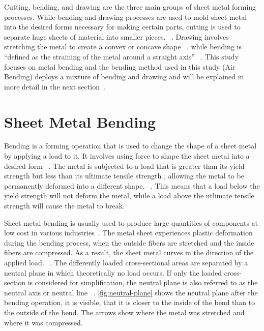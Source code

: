 Cutting, bending, and drawing are the three main groups of sheet metal forming processes.
While bending and drawing processes are used to mold sheet metal into the desired forms necessary for making certain
parts, cutting is used to separate huge sheets of material into smaller pieces.
~\cite[p. 405]{groover_fundamentalsmodernmanufacturing_2020}.
Drawing involves stretching the metal to create a convex or concave shape
~\cite[p. 416]{groover_fundamentalsmodernmanufacturing_2020}, while bending is ``defined as the straining of the
metal around a straight axis''
~\cite[p. 412]{groover_fundamentalsmodernmanufacturing_2020}.
This study focuses on metal bending and the bending method used in this study (Air Bending) deploys a mixture of
bending and drawing and will be explained in more detail in the next
section~\cite[pp. 416]{groover_fundamentalsmodernmanufacturing_2020}.


\section{Sheet Metal Bending}\label{sec:bending}
Bending is a forming operation that is used to change the shape of a sheet metal by
applying a load to it.
It involves using force to shape the sheet metal into a desired form
~\cite[p. 1]{dib_singleensembleclassifiers_2020}.
The metal is subjected to a load that is greater than its yield strength but less than its ultimate tensile strength
, allowing the metal to be permanently deformed into a different shape.
~\cite[p. 1]{baig_machinelearningprediction_2021}.
This means that a load below the yield strength will not deform the metal, while a load above the utlimate tensile
strength will cause the metal to break.

Sheet metal bending is usually used to produce large quantities of components at low cost in various
industries~\cite[p. 1]{dib_singleensembleclassifiers_2020}.
The metal sheet experiences plastic deformation during the bending process, when the outside fibers are stretched and
the inside fibers are compressed.
As a result, the sheet metal curves in the direction of the applied load.
~\cite[pp. 1--3]{baig_machinelearningprediction_2021}.
The differently loaded cross-sectional areas are separated by a neutral plane in which theoretically no load occurs.
If only the loaded cross-section is considered for simplification, the neutral plane is also referred to as the
neutral axis or neutral line
~\cite[pp. 67]{gustafson1998analytical}.
\cref{fig:neutral-plane} shows the neutral plane after the bending operation, it is
visible, that it is closer to the inside of the bend than to the outside of the bend.
The arrows show where the metal was stretched and where it was compressed.

